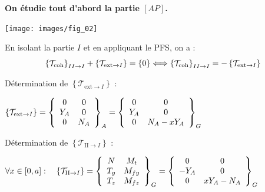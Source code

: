 \documentclass[10pt,fleqn]{article} %
\begin{document}
\ifprof
\begin{corrige}

\textbf{On étudie tout d'abord la partie $[AP]$.}
\begin{center}
\texttt{[image: images/fig\_02]}
\end{center}

%
%
%
%

En isolant la partie $I$ et en appliquant le PFS, on a : 
$$
\torseurscoh_{II \rightarrow I} + \left\{\mathcal{T}_{\text{ext}\rightarrow I}\right\}  = \{0\}
\Longleftrightarrow \torseurscoh_{II \rightarrow I} =  - \left\{\mathcal{T}_{\text{ext}\rightarrow I}\right\}
$$ 

Détermination de $\left\{\mathcal{T}_{\text{ext}\rightarrow I}\right\}$ :

$\left\{\mathcal{T}_{\text{ext}\rightarrow I}\right\}
=  \torseurcol{0}{Y_A}{0}{0}{0}{N_A}{A} 
=  \torseurcol{0}{Y_A}{0}{0}{0}{N_A-xY_A}{G} 
$ 


Détermination de $ \left\{\mathcal{T}_{\text{II}\rightarrow I}\right\}$ :

$
\forall x \in [0,a] : \quad 
\left\{\mathcal{T}_{\text{II}\rightarrow I}\right\} 
= \torseurcol{N}{T_y}{T_z}{M_t}{M_{fy}}{M_{fz}}{G}
=  \torseurcol{0}{-Y_A}{0}{0}{0}{xY_A-N_A}{G} 
$

\end{corrige}
\end{document}
